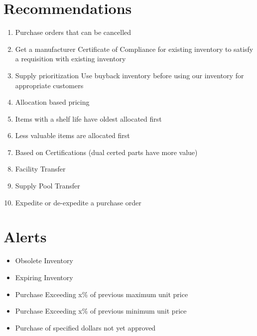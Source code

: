 \documentclass[letterpaper,10pt,english]{sphinxmanual}
\begin{document}
\section{Recommendations}
\label{\detokenize{BusinessProcessReengineering:recommendations}}\begin{enumerate}
%
\item {} 
Purchase orders that can be cancelled

\item {} 
Get a manufacturer Certificate of Compliance for existing inventory
to satisfy a requisition with existing inventory

\item {} 
Supply prioritization Use buyback inventory before using our
inventory for appropriate customers

\item {} 
Allocation based pricing

\item {} 
Items with a shelf life have oldest allocated first

\item {} 
Less valuable items are allocated first

\item {} 
Based on Certifications (dual certed parts have more value)

\item {} 
Facility Transfer

\item {} 
Supply Pool Transfer

\item {} 
Expedite or de-expedite a purchase order

\end{enumerate}


\section{Alerts}
\label{\detokenize{BusinessProcessReengineering:alerts}}\begin{itemize}
\item {} 
Obsolete Inventory

\item {} 
Expiring Inventory

\item {} 
Purchase Exceeding x\% of previous maximum unit price

\item {} 
Purchase Exceeding x\% of previous minimum unit price

\item {} 
Purchase of specified dollars not yet approved

\end{itemize}
\end{document}
